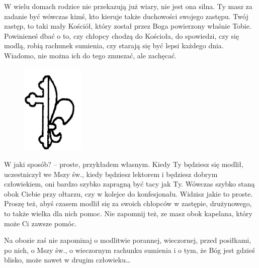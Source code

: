 W wielu domach rodzice nie przekazują już wiary, nie jest ona silna. Ty masz za zadanie być wówczas kimś, kto kieruje także duchowości swojego zastępu. Twój zastęp, to taki mały Kościół, który został przez Boga powierzony właśnie Tobie. Powinieneś dbać o to, czy chłopcy chodzą do Kościoła, do spowiedzi, czy się modlą, robią rachunek sumienia, czy starają się być lepsi każdego dnia. Wiadomo, nie można ich do tego zmuszać, ale zachęcać. \begin{figure}
  \begin{center}
    \includegraphics[width=3cm]{grafiki/duchowosc.png}
  \end{center}
\end{figure} W jaki sposób? – proste, przykładem własnym. Kiedy Ty będziesz się modlił, uczestniczył we Mszy św., kiedy będziesz lektorem i będziesz dobrym człowiekiem, oni bardzo szybko zapragną być tacy jak Ty. Wówczas szybko staną obok Ciebie przy ołtarzu, czy w kolejce do konfesjonału. Widzisz jakie to proste. Proszę też, abyś czasem modlił się za swoich chłopców w zastępie, drużynowego, to także wielka dla nich pomoc. Nie zapomnij też, ze masz obok kapelana, który może Ci zawsze pomóc.

Na obozie zaś nie zapominaj o modlitwie porannej, wieczornej, przed posiłkami, po nich, o Mszy św., o wieczornym rachunku sumienia i o tym, że Bóg jest gdzieś blisko, może nawet w drugim człowieku\ldots